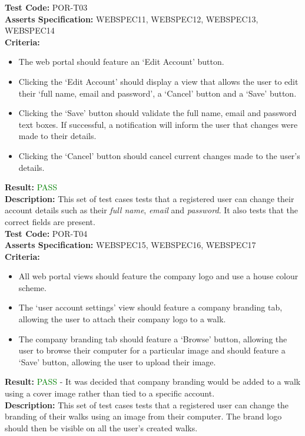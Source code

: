 \documentclass[11pt,a4paper]{report}
\begin{document}
\label{test:POR-T03}
\noindent\textbf{Test Code:} POR-T03\\
\textbf{Asserts Specification:} WEBSPEC11, WEBSPEC12, WEBSPEC13, WEBSPEC14 \\ 
\textbf{Criteria:} \begin{itemize}
                     \item The web portal should feature an `Edit Account' button.
                     \item Clicking the `Edit Account' should display a view that allows the user to edit their `full name, email and password', a `Cancel' button and a `Save' button.
                     \item Clicking the `Save' button should validate the full name, email and password text boxes. If successful, a notification will inform the user that changes were made to their details.
                     \item Clicking the `Cancel' button should cancel current changes made to the user's details.
                   \end{itemize}  
\textbf{Result:} \textcolor{green}{PASS}\\ 
\textbf{Description:} This set of test cases tests that a registered user can change their account details such as their \emph{full name}, \emph{email} and \emph{password}. It also tests that the correct fields are present. \\

\label{test:POR-T04}
\noindent\textbf{Test Code:} POR-T04\\
\textbf{Asserts Specification:} WEBSPEC15, WEBSPEC16, WEBSPEC17 \\ 
\textbf{Criteria:} \begin{itemize}
                     \item All web portal views should feature the company logo and use a house colour scheme.
                     \item The `user account settings' view should feature a company branding tab, allowing the user to attach their company logo to a walk.
                     \item The company branding tab should feature a `Browse' button, allowing the user to browse their computer for a particular image and should feature a `Save' button, allowing the user to upload their image.
                   \end{itemize}  
\textbf{Result:} \textcolor{green}{PASS} - It was decided that company branding would be added to a walk using a cover image rather than tied to a specific account.\\ 
\textbf{Description:} This set of test cases tests that a registered user can change the branding of their walks using an image from their computer. The brand logo should then be visible on all the user's created walks. \\
\end{document}
